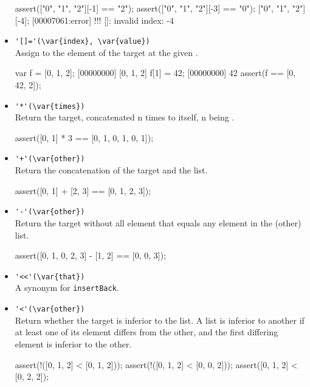 \begin{itemize}
\begin{urbiscript}[firstnumber=last]
assert(["0", "1", "2"][-1] == "2");
assert(["0", "1", "2"][-3] == "0");
["0", "1", "2"][-4];
[00007061:error] !!! []: invalid index: -4
\end{urbiscript}

\item \lstinline|'[]='(\var{index}, \var{value})|\\
  Assign  to the element of the target at the given
  .

\begin{urbiscript}[firstnumber=last]
var f = [0, 1, 2];
[00000000] [0, 1, 2]
f[1] = 42;
[00000000] 42
assert(f == [0, 42, 2]);
\end{urbiscript}

\item \lstinline|'*'(\var{times})|\\
Return the target, concatenated n times to itself, n being .

\begin{urbiscript}[firstnumber=last]
assert([0, 1] * 3 == [0, 1, 0, 1, 0, 1]);
\end{urbiscript}

\item \lstinline|'+'(\var{other})|\\
Return the concatenation of the target and the  list.

\begin{urbiscript}[firstnumber=last]
assert([0, 1] + [2, 3] == [0, 1, 2, 3]);
\end{urbiscript}

\item \lstinline|'-'(\var{other})|\\
Return the target without all element that equals any element in the
\var(other) list.

\begin{urbiscript}[firstnumber=last]
assert([0, 1, 0, 2, 3] - [1, 2] == [0, 0, 3]);
\end{urbiscript}

\item \lstinline|'<<'(\var{that})|\\
  A synonym for \lstinline|insertBack|.

\item \lstinline|'<'(\var{other})|\\
  Return whether the target is inferior to the  list. A
  list is inferior to another if at least one of its element differs
  from the other, and the first differing element is inferior to the
  other.

\begin{urbiscript}[firstnumber=last]
assert(!([0, 1, 2] < [0, 1, 2]));
assert(!([0, 1, 2] < [0, 0, 2]));
assert([0, 1, 2] < [0, 2, 2]);
\end{urbiscript}

\end{itemize}


